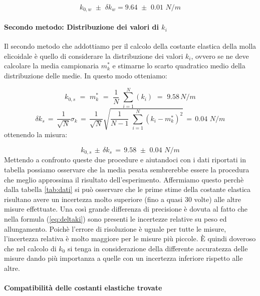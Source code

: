 \begin{equation}
    k_{0,w} \,\, \pm \,\, \delta k_{w} =  9.64 \,\, \pm \,\, 0.01 \,\,N/m
    \label{eq:w}
\end{equation}

\paragraph{Secondo metodo: Distribuzione dei valori di $k_i$\\}
Il secondo metodo che addottiamo per il calcolo della costante elastica della molla elicoidale è quello di considerare la distribuzione dei valori $k_i$, ovvero se ne deve calcolare la media campionaria $m^*_k$ e stimarne lo scarto quadratico medio della distribuzione delle medie. In questo modo otteniamo:

\begin{equation*}
    k_{0,s} \,\,=\,\, m^*_k \,\,=\,\, \frac{1}{N}\,\,\sum_{i=1}^{N} (k_i) \,\,=\,\, 9.58  \,N/m
\end{equation*}
%
\begin{equation*}
    \delta k_{s}  \,=\, \frac{1}{\sqrt{N}} \sigma_{k} \,=\, \frac{1}{\sqrt{N}}\sqrt{\frac{1}{N - 1}\,\,\sum_{i=1}^{N} (k_i - m^*_k)^2}\,=\, 0.04 \,\,N/m
\end{equation*}
%
ottenendo la misura:

\begin{equation}
    k_{0,s} \, \pm \, \delta k_{s} \,=\, 9.58 \,\, \pm \,\, 0.04 \,\, N/m
    \label{eq:s}
\end{equation}
%
Mettendo a confronto queste due procedure e aiutandoci con i dati riportati in tabella possiamo osservare che la media pesata sembrerebbe essere la procedura che meglio approssima il risultato dell'esperimento. Affermiamo questo perchè dalla tabella \ref{tab:dati} si può osservare che le prime stime della costante elastica risultano avere un incertezza molto superiore (fino a quasi 30 volte) alle altre misure effettuate. Una così grande differenza di precisione è dovuta al fatto che nella formula (\ref{eq:deltaki}) sono presenti le incertezze relative su peso ed allungamento. Poichè l'errore di risoluzione è uguale per tutte le misure, l'incertezza relativa è molto maggiore per le misure più piccole.  È quindi doveroso che nel calcolo di $k_0$ si tenga in considerazione della differente accuratezza delle misure dando più importanza a quelle con un incertezza inferiore rispetto alle altre.

\paragraph{Compatibilità delle costanti elastiche trovate\\}

